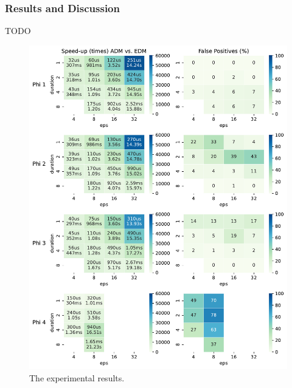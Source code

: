 \subsubsection{Results and Discussion}
\alert{TODO}
\begin{figure}[htb]
	\begin{center}
	\includegraphics[width=\linewidth]{speedup}
\caption{The experimental results.}
\end{center}
\end{figure}